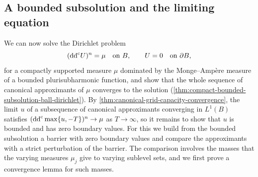 \subsection{A bounded subsolution and the limiting equation}
\label{sec:bounded-subsolution-ball-equation}
We can now solve the Dirichlet problem
\[
 (\mathrm{dd}^{\mathrm{c}} U)^n=\mu\quad\text{on }B,\qquad U=0\quad\text{on }\partial B,
\]
for a compactly supported measure $\mu$ dominated by the Monge--Amp\`ere measure of a bounded plurisubharmonic function, and show that the whole sequence of canonical approximants of $\mu$ converges to the solution (\cref{thm:compact-bounded-subsolution-ball-dirichlet}). By \cref{thm:canonical-grid-capacity-convergence}, the limit $u$ of a subsequence of canonical approximants converging in $L^1(B)$ satisfies $(\mathrm{dd}^{\mathrm{c}}\max\{u,-T\})^n\to\mu$ as $T\to\infty$, so it remains to show that $u$ is bounded and has zero boundary values. For this we build from the bounded subsolution a barrier with zero boundary values and compare the approximants with a strict perturbation of the barrier. The comparison involves the masses that the varying measures $\mu_j$ give to varying sublevel sets, and we first prove a convergence lemma for such masses.

